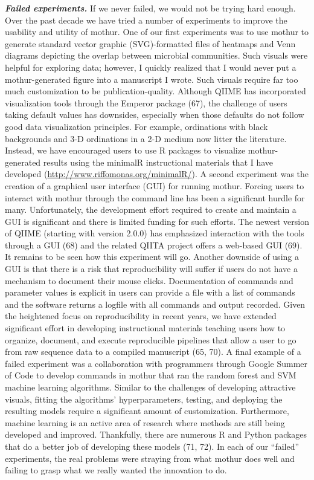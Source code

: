 \documentclass[11pt,]{article}
\begin{document}
\textbf{\emph{Failed experiments.}} If we never failed, we would not be
trying hard enough. Over the past decade we have tried a number of
experiments to improve the usability and utility of mothur. One of our
first experiments was to use mothur to generate standard vector graphic
(SVG)-formatted files of heatmaps and Venn diagrams depicting the
overlap between microbial communities. Such visuals were helpful for
exploring data; however, I quickly realized that I would never put a
mothur-generated figure into a manuscript I wrote. Such visuals require
far too much customization to be publication-quality. Although QIIME has
incorporated visualization tools through the Emperor package (67), the
challenge of users taking default values has downsides, especially when
those defaults do not follow good data visualization principles. For
example, ordinations with black backgrounds and 3-D ordinations in a 2-D
medium now litter the literature. Instead, we have encouraged users to
use R packages to visualize mothur-generated results using the minimalR
instructional materials that I have developed
(\url{http://www.riffomonas.org/minimalR/}). A second experiment was the
creation of a graphical user interface (GUI) for running mothur. Forcing
users to interact with mothur through the command line has been a
significant hurdle for many. Unfortunately, the development effort
required to create and maintain a GUI is significant and there is
limited funding for such efforts. The newest version of QIIME (starting
with version 2.0.0) has emphasized interaction with the tools through a
GUI (68) and the related QIITA project offers a web-based GUI (69). It
remains to be seen how this experiment will go. Another downside of
using a GUI is that there is a risk that reproducibility will suffer if
users do not have a mechanism to document their mouse clicks.
Documentation of commands and parameter values is explicit in users can
provide a file with a list of commands and the software returns a
logfile with all commands and output recorded. Given the heightened
focus on reproducibility in recent years, we have extended significant
effort in developing instructional materials teaching users how to
organize, document, and execute reproducible pipelines that allow a user
to go from raw sequence data to a compiled manuscript (65, 70). A final
example of a failed experiment was a collaboration with programmers
through Google Summer of Code to develop commands in mothur that ran the
random forest and SVM machine learning algorithms. Similar to the
challenges of developing attractive visuals, fitting the algorithms'
hyperparameters, testing, and deploying the resulting models require a
significant amount of customization. Furthermore, machine learning is an
active area of research where methods are still being developed and
improved. Thankfully, there are numerous R and Python packages that do a
better job of developing these models (71, 72). In each of our
``failed'' experiments, the real problems were straying from what mothur
does well and failing to grasp what we really wanted the innovation to
do.
\end{document}
